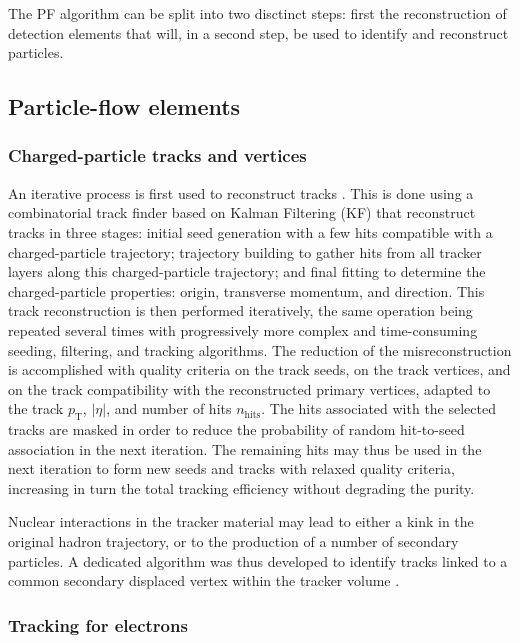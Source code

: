 \label{sec:pf}

The PF algorithm can be split into two disctinct steps: first the reconstruction of detection elements that will, in a second step, be used to identify and reconstruct particles.

\subsection{Particle-flow elements}

\subsubsection{Charged-particle tracks and vertices}
An iterative process is first used to reconstruct tracks \cite{Collaboration_2014}. This is done using a combinatorial track finder based on Kalman Filtering (KF) that reconstruct tracks in three stages:  initial seed generation with a few hits compatible with a charged-particle trajectory; trajectory building to gather hits from all tracker layers along this charged-particle trajectory; and final fitting to determine the charged-particle properties: origin, transverse momentum, and direction. This track reconstruction is then performed iteratively, the same operation being repeated several times with progressively more complex and time-consuming seeding, filtering, and tracking algorithms. The reduction of the misreconstruction is accomplished with quality criteria on the track seeds, on the track vertices, and on the track compatibility with the reconstructed primary vertices, adapted to the track $p_{\mathrm{T}}$, $|\eta|$, and number of hits $n_{\mathrm{hits}}$. The hits associated with the selected tracks are masked in order to reduce the probability of random hit-to-seed association in the next iteration. The remaining hits may thus be used in the next iteration to form new seeds and tracks with relaxed quality criteria, increasing in turn the total tracking efficiency without degrading the purity.

Nuclear interactions in the tracker material may lead to either a kink in the original hadron trajectory, or to the production of a number of secondary particles. A dedicated algorithm was thus developed to identify tracks linked to a common secondary displaced vertex within the tracker volume \cite{CMS-PAS-TRK-10-003,Khachatryan2010}.

\subsubsection{Tracking for electrons}

